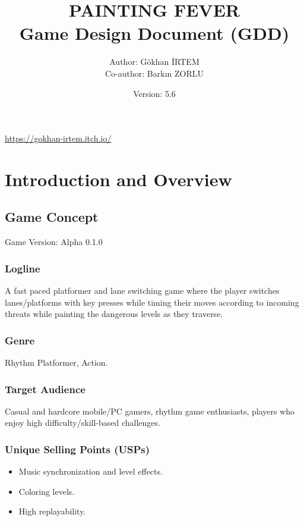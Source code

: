 \documentclass[11pt,a4paper]{report}
\title{PAINTING FEVER\\\large Game Design Document (GDD)}
\author{Author: Gökhan İRTEM \\ Co-author: Barkın ZORLU}
\date{Version: 5.6}
\begin{document}
\maketitle
\vspace{2em}
\begin{center}
\href{https://gokhan-irtem.itch.io/}{https://gokhan-irtem.itch.io/}
\end{center}

\tableofcontents
\clearpage
{}

\chapter{Introduction and Overview}
\section{Game Concept}
Game Version: Alpha 0.1.0

\subsection{Logline}
A fast paced platformer and lane switching game where the player switches lanes/platforms with key presses while timing their moves according to incoming threats while painting the dangerous levels as they traverse.

\subsection{Genre}
Rhythm Platformer, Action.

\subsection{Target Audience}
Casual and hardcore mobile/PC gamers, rhythm game enthusiasts, players who enjoy high difficulty/skill-based challenges.

\subsection{Unique Selling Points (USPs)}
\begin{itemize}
  \item Music synchronization and level effects.
  \item Coloring levels.
  \item High replayability.
\end{itemize}
\end{document}
